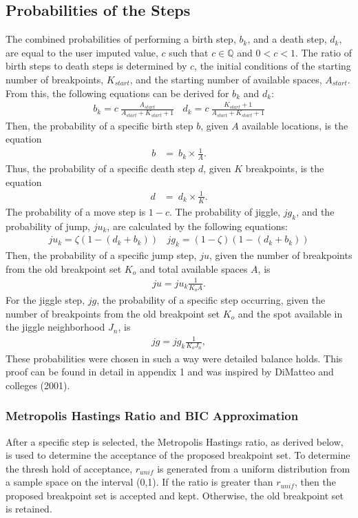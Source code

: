 \documentclass[submit]{smj}
\begin{document}
\subsection{Probabilities of the Steps}
The combined probabilities of performing a birth step, $b_k$, and a death step, $d_k$, are equal to the user imputed value, $c$ such that $c \in \mathbb{Q}$ and $0 < c < 1$. The ratio of birth steps to death steps is determined by $c$, the initial conditions of the starting number of breakpoints, $K_{start}$, and the starting number of available spaces, $A_{start}$. From this, the following equations can be derived for $b_k$ and $d_k$: 
\begin{align*}
b_k =  c \ \frac{A_{start}}{A_{start}+ K_{start}+1}  \ \ \ \ d_k =  c \  \frac{K_{start}+1}{A_{start}+ K_{start}+1}
\end{align*}
Then, the probability of a specific birth step $b$, given $A$ available locations, is the equation 
\begin{align*}
b &=  \ b_k \times \frac{1}{A}.
\end{align*}
Thus, the probability of a specific death step $d$, given $K$ breakpoints, is the equation
\begin{align*}
d &=  \ d_k \times \frac{1}{K}.
\end{align*}
The probability of a move step is $1-c$. The probability of jiggle, $jg_k$, and the probability of jump, $ju_k$, are calculated by the following equations: 
\begin{align*}
ju_k =\zeta (1-  (d_k + b_k))  \ \ \ \ jg_k =(1-\zeta)(1-(d_k + b_k)) 
\end{align*}
Then, the probability of a specific jump step, $ju$, given the number of breakpoints from the old breakpoint set $K_o$ and total available spaces $A$, is
\begin{align*}
ju =ju_k \frac{1}{K_{o} A}.  
\end{align*}
For the jiggle step, $jg$, the probability of a specific step occurring, given the number of breakpoints from the old breakpoint set $K_o$ and the spot available in the jiggle neighborhood $J_{n}$, is
\begin{align*}
jg= jg_k  \frac{1}{K_{o} J_{n}},
\end{align*}
These probabilities were chosen in such a way were detailed balance holds. This proof can be found in detail in appendix 1 and was inspired by DiMatteo and colleges (2001). 


\subsubsection{Metropolis Hastings Ratio and BIC Approximation} 
After a specific step is selected, the Metropolis Hastings ratio, as derived below, is used to determine the acceptance of the proposed breakpoint set. To determine the thresh hold of acceptance,  $r_{unif}$ is generated from a uniform distribution from a sample space on the interval (0,1). If the ratio is greater than $r_{unif}$, then the proposed breakpoint set is accepted and kept. Otherwise, the old breakpoint set is retained.
\end{document}
